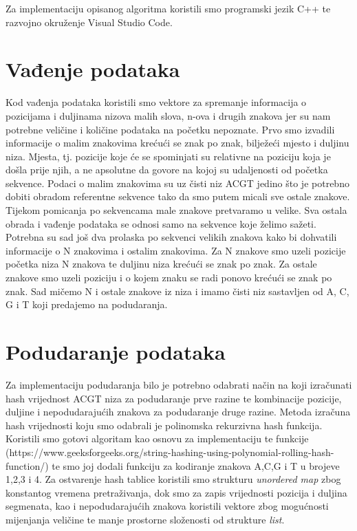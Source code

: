 Za implementaciju opisanog algoritma koristili smo programski jezik C++ te razvojno okruženje Visual Studio Code.

\section{Vađenje podataka}
Kod vađenja podataka koristili smo vektore za spremanje informacija o pozicijama i duljinama nizova malih slova, n-ova i drugih znakova jer su nam potrebne veličine i količine podataka na početku nepoznate. Prvo smo izvadili informacije o malim znakovima krećući se znak po znak, bilježeći mjesto i duljinu niza. Mjesta, tj. pozicije koje će se spominjati su relativne na poziciju koja je došla prije njih, a ne apsolutne da govore na kojoj su udaljenosti od početka sekvence. Podaci o malim znakovima su uz čisti niz ACGT jedino što je potrebno dobiti obradom referentne sekvence tako da smo putem micali sve ostale znakove. Tijekom pomicanja po sekvencama male znakove pretvaramo u velike. Sva ostala obrada i vađenje podataka se odnosi samo na sekvence koje želimo sažeti. Potrebna su sad još dva prolaska po sekvenci velikih znakova kako bi dohvatili informacije o N znakovima i ostalim znakovima. Za N znakove smo uzeli pozicije početka niza N znakova te duljinu niza krećući se znak po znak. Za ostale znakove smo uzeli poziciju i o kojem znaku se radi ponovo krećući se znak po znak. Sad mičemo N i ostale znakove iz niza i imamo čisti niz sastavljen od A, C, G i T koji predajemo na podudaranja.
\pagebreak
\section{Podudaranje podataka}
Za implementaciju podudaranja bilo je potrebno odabrati način na koji izračunati hash vrijednost ACGT niza za podudaranje prve razine te kombinacije pozicije, duljine i nepodudarajućih znakova za podudaranje druge razine. Metoda izračuna hash vrijednosti koju smo odabrali je polinomska rekurzivna hash funkcija. Koristili smo gotovi algoritam kao osnovu za implementaciju te funkcije (https://www.geeksforgeeks.org/string-hashing-using-polynomial-rolling-hash-function/) te smo joj dodali funkciju za kodiranje znakova A,C,G i T u brojeve 1,2,3 i 4.
Za ostvarenje hash tablice koristili smo strukturu \textit{unordered map} zbog konstantog vremena pretraživanja, dok smo za zapis vrijednosti pozicija i duljina segmenata, kao i nepodudarajućih znakova koristili vektore zbog mogućnosti mijenjanja veličine te manje prostorne složenosti od strukture \textit{list}.

